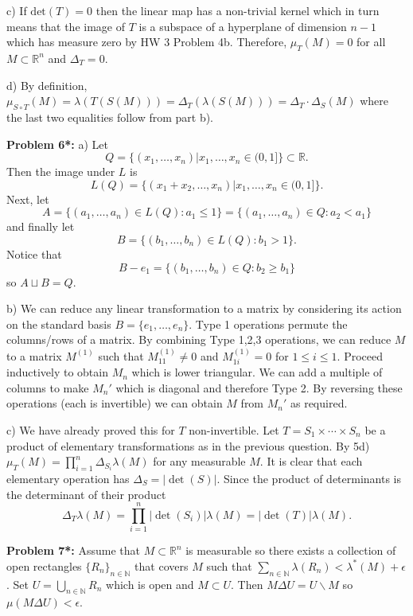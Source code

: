 \documentclass[12pt]{amsart} %
\def\N{\mathbb{N}}
\def\R{\mathbb{R}}
\begin{document}
\smallskip  c) If $\mathrm{det}(T) = 0$ then the linear map has a non-trivial kernel which in turn means that the image of  $T$ is a subspace of a hyperplane of dimension  $n-1$ which has measure zero by HW 3 Problem 4b. Therefore,  $\mu_T(M) = 0$ for all $M \subset \R^n$ and $\Delta_T = 0$.   
  
\smallskip  d) By definition, $\mu_{S\circ T}(M) = \lambda(T(S(M))) = \Delta_T (\lambda(S(M))) = \Delta_T \cdot \Delta_S (M)$ where the last two equalities follow from part b). 

 


  

\bigskip
\noindent
\textbf{Problem 6*:}
\smallskip  a) Let $$Q = \{\left( x_1, \ldots, x_n \right) | x_1,\ldots,x_n \in (0,1]\} \subset \R.$$ Then the image under $L$ is  $$L(Q) =  \{\left( x_1+x_2, \ldots, x_n \right) | x_1,\ldots,x_n \in (0,1]\}.$$ Next, let $$A = \{\left( a_1, \ldots, a_n \right) \in L(Q) : a_1 \le  1\} = \{(a_1, \ldots, a_n) \in Q: a_2 < a_1\}$$ and finally let $$B = \{\left( b_1,\ldots,b_n \right) \in L(Q): b_1 > 1\}.$$ Notice that $$B - e_1 = \{\left( b_1, \ldots, b_n \right) \in Q: b_2 \ge b_1\} $$ so $A \sqcup B = Q.$

\smallskip
b) We can reduce any linear transformation to a matrix by considering its action on the standard basis $B = \{e_1, \ldots, e_n\}.$ Type 1 operations permute the columns/rows of a matrix. By combining Type 1,2,3 operations, we can reduce $M$ to a matrix  $M^{(1)}$ such that  $M^{(1)}_{11} \neq 0$ and $M^{(1)}_{1i} = 0$ for  $1 \le  i \le 1$. Proceed inductively to obtain $M_n$ which is lower triangular. We can add a multiple of columns to make $M_n'$ which is diagonal and therefore Type 2. By reversing these operations (each is invertible) we can obtain $M$ from $M_n'$ as required. 

\smallskip
c) We have already proved this for $T$ non-invertible. Let $T = S_1 \times \cdots \times S_n$ be a product of elementary transformations as in the previous question. By 5d) $\mu_T(M) = \prod_{i = 1}^n \Delta_{S_i}\lambda(M)$ for any measurable $M$. It is clear that each elementary operation has  $\Delta_S = |\det(S)|$. Since the product of determinants is the determinant of their product 
$$\Delta_T \lambda(M) = \prod_{i=1}^n |\det(S_i)|\lambda(M) = |\det(T)|\lambda(M).$$ 



\bigskip
\noindent
\textbf{Problem 7*:} Assume that $M \subset \R^n$ is measurable so there exists a collection of open rectangles $\{R_n\}_{n \in \N}$ that covers $M$ such that  $\sum_{n \in \N}\lambda(R_n) < \lambda^*(M) + \epsilon$. Set $U = \bigcup_{n \in \N}R_n$ which is open and $M \subset U$. Then $M\Delta U = U \backslash M$ so $\mu\left(M \Delta U\right) < \epsilon$.   
\end{document}
